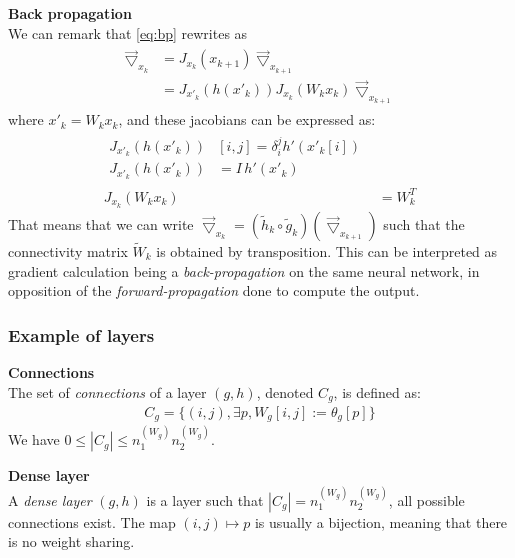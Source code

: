 \begin{remark}\textbf{Back propagation}\\
We can remark that \eqref{eq:bp} rewrites as
\begin{align}
  \begin{split}
  \vec{\bigtriangledown}_{x_k} & = J_{x_k}(x_{k+1}) \vec{\bigtriangledown}_{x_{k+1}} \\ 
                               & = J_{x'_k}(h(x'_k)) J_{x_k}(W_k x_k) \vec{\bigtriangledown}_{x_{k+1}}
  \end{split}
\end{align}
where $x'_k = W_k x_k$, and these jacobians can be expressed as:
\begin{align}
  \begin{split}
  J_{x'_k}(h(x'_k)) & [i,j] = \delta_i^j h'(x'_k[i])\\
  J_{x'_k}(h(x'_k)) & = I \hspace{2pt} h'(x'_k)
  \end{split}\\
  J_{x_k}(W_k x_k) & = W_k^T
\end{align}
That means that we can write $\vec{\bigtriangledown}_{x_k} = (\widetilde{h}_k \circ \widetilde{g}_k)(\vec{\bigtriangledown}_{x_{k+1}})$ such that the connectivity matrix $\widetilde{W}_k$ is obtained by transposition. This can be interpreted as gradient calculation being a \emph{back-propagation} on the same neural network, in opposition of the \emph{forward-propagation} done to compute the output.
\end{remark}

\subsubsection{Example of layers}

\begin{definition}\textbf{Connections}\\
The set of \emph{connections} of a layer $(g,h)$, denoted $C_g$, is defined as:
\begin{gather*}
  C_g = \{(i,j), \exists p, W_g[i,j] := \theta_g[p]\}
\end{gather*}
We have $0 \leq |C_g| \leq n_1^{(W_g)} n_2^{(W_g)}$.
\end{definition}

\begin{definition}\textbf{Dense layer}\\
A \emph{dense layer} $(g,h)$ is a layer such that $|C_g| = n_1^{(W_g)} n_2^{(W_g)}$, \ie all possible connections exist. The map $(i,j) \mapsto p$ is usually a bijection, meaning that there is no weight sharing.
\end{definition}

